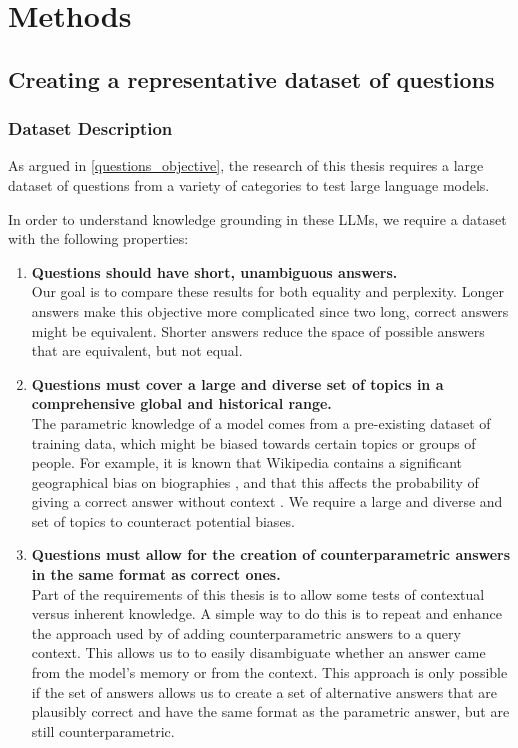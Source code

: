 \section{Methods}

\subsection{Creating a representative dataset of questions}
\label{creating_dataset}

\subsubsection{Dataset Description}

As argued in \cref{questions_objective}, the research of this thesis requires a large dataset of questions from a variety of categories to test large language models.

In order to understand knowledge grounding in these LLMs, we require a dataset with the following properties:
\begin{enumerate}
	\item \textbf{Questions should have short, unambiguous answers.} \\
		Our goal is to compare these results for both equality and perplexity. Longer answers make this objective more complicated since two long, correct answers might be equivalent. Shorter answers reduce the space of possible answers that are equivalent, but not equal.
	\item \textbf{Questions must cover a large and diverse set of topics in a comprehensive global and historical range.} \\
	    The parametric knowledge of a model comes from a pre-existing dataset of training data, which might be biased towards certain topics or groups of people. For example, it is known that Wikipedia contains a significant geographical bias on biographies \citep{wikipedia_geographic_bias}, and that this affects the probability of giving a correct answer without context \citep{factual_recall}.
		We require a large and diverse and set of topics to counteract potential biases.
	\item \textbf{Questions must allow for the creation of counterparametric answers in the same format as correct ones.} \\
		Part of the requirements of this thesis is to allow some tests of contextual versus inherent knowledge.
	    A simple way to do this is to repeat and enhance the approach used by \citeauthor{factual_recall} of adding counterparametric answers to a query context.
		This allows us to to easily disambiguate whether an answer came from the model's memory or from the context.
	    This approach is only possible if the set of answers allows us to create a set of alternative answers that are plausibly correct and have the same format as the parametric answer, but are still counterparametric.
\end{enumerate}


